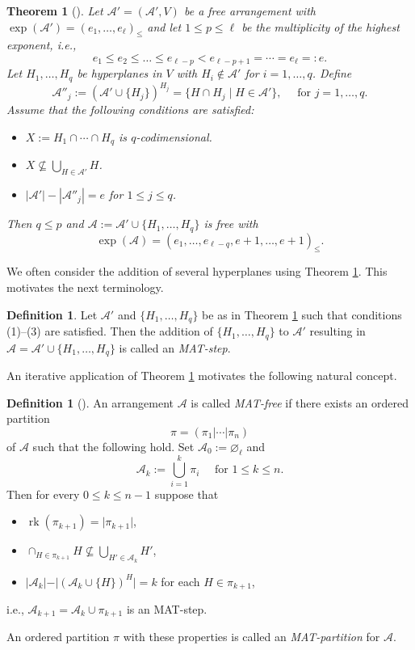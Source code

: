 \documentclass[12pt]{amsart}
\newcommand\CA{{\mathscr A}}
\newcommand\rk{\operatorname{rk}}
\numberwithin{equation}{section}
\theoremstyle{plain}
\newtheorem{theorem}[equation]{Theorem}
\theoremstyle{definition}
\newtheorem{defn}[equation]{Definition}
\begin{document}
\begin{theorem}[{\cite[Thm.~3.1]{abeetall:weyl}}]
	\label{Thm_MAT}
	Let $\CA' = (\CA', V)$ be a free arrangement with
	$\exp(\CA')=(e_1,\ldots,e_\ell)_\le$
	and let $1 \le p \le \ell$ be the multiplicity of the highest exponent, i.e.,
	\[ e_1 \leq e_2 \leq \ldots \leq e_{\ell-p} < e_{\ell-p+1} =\cdots=e_\ell=:e. \]
	Let $H_1,\ldots,H_q$ be hyperplanes in $V$ with
	$H_i \not \in \CA'$ for $i=1,\ldots,q$. Define
	\[ \CA''_j:=(\CA'\cup \{H_j\})^{H_j}=\{H\cap H_{j} \mid H\in \CA'\}, \quad \text{ for }j=1,\ldots,q. \]
	Assume that the following conditions are satisfied:
	\begin{itemize}
		\item[(1)]
		$X:=H_1 \cap \cdots \cap H_q$ is $q$-codimensional.
		\item[(2)]
		$X \not \subseteq \bigcup_{H \in \CA'} H$.
		\item[(3)]
		$|\CA'|-|\CA''_j|=e$ for $1 \le j \le q$.
	\end{itemize}
	Then $q \leq p$ and $\CA:=\CA' \cup \{H_1,\ldots,H_q\}$ is free with
	$$\exp(\CA)=(e_1,\ldots,e_{\ell-q},e+1,\ldots,e+1)_\le.$$
\end{theorem}

We often consider the addition of several hyperplanes using
Theorem \ref{Thm_MAT}. This motivates the next terminology.

\begin{defn}
	\label{def:MATstep}
	Let $\CA'$ and $\{H_1,\ldots,H_q\}$ be as in Theorem \ref{Thm_MAT} such that
	conditions (1)--(3) are satisfied. Then the addition 
	of $\{H_1,\ldots,H_q\}$ to $\CA'$ resulting in $\CA = \CA' \cup \{H_1,\ldots,H_q\}$
	is called an \emph{MAT-step}.
\end{defn}

An iterative application of Theorem \ref{Thm_MAT} motivates the following natural concept.

\begin{defn}%
	[{\cite[Def.~13, Lem.~19]{Cunzmuecksch:MATfree}}]
	\label{def:MATfree}%
	An arrangement $\CA$ is called \emph{MAT-free} if there exists an ordered partition
	\[
	\pi = (\pi_1|\cdots|\pi_n)
	\] 
	of $\CA$ such that the following hold. 
	Set $\CA_0 := \varnothing_\ell$ and
	\[
	\CA_k := \bigcup_{i=1}^k \pi_i \quad\text{ for } 1 \leq k \leq n.
	\]
	Then for every $0 \leq k \leq n-1$ suppose that
	\begin{itemize}
		\item[(1)] $\rk(\pi_{k+1}) = \vert \pi_{k+1} \vert$,
		\item[(2)] $\cap_{H \in \pi_{k+1}} H \nsubseteq \bigcup_{H' \in \CA_k}H'$,
		\item[(3)] $\vert \CA_k \vert - \vert (\CA_k \cup \{H\})^H \vert = k$ for each $H \in \pi_{k+1}$,
	\end{itemize}
	i.e., $\CA_{k+1} = \CA_{k}\cup\pi_{k+1}$ is an MAT-step.
	
	An ordered partition $\pi$ with these properties is called an \emph{MAT-partition} for $\CA$.
\end{defn}
\end{document}
